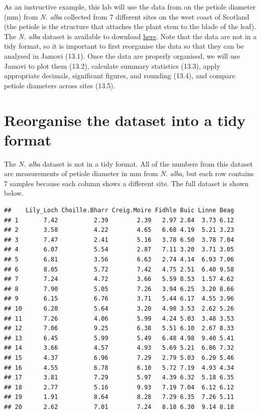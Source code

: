 \documentclass[
]{scrbook}
\begin{document}
As an instructive example, this lab will use the data from \citet{Law2014} on the petiole diameter (mm) from \emph{N. alba} collected from 7 different sites on the west coast of Scotland (the petiole is the structure that attaches the plant stem to the blade of the leaf).
The \emph{N. alba} dataset is available to download \href{https://raw.githubusercontent.com/bradduthie/statistical_techniques/main/data/Nymphaea_alba.csv}{here}.
Note that the data are not in a tidy format, so it is important to first reorganise the data so that they can be analysed in Jamovi (13.1).
Once the data are properly organised, we will use Jamovi to plot them (13.2), calculate summary statistics (13.3), apply appropriate decimals, significant figures, and rounding (13.4), and compare petiole diameters across sites (13.5).

\hypertarget{reorganise-the-dataset-into-a-tidy-format}{%
\section{Reorganise the dataset into a tidy format}\label{reorganise-the-dataset-into-a-tidy-format}}

The \emph{N. alba} dataset is not in a tidy format.
All of the numbers from this dataset are measurements of petiole diameter in mm from \emph{N. alba}, but each row contains 7 samples because each column shows a different site.
The full dataset is shown below.

\begin{verbatim}
##    Lily_Loch Choille.Bharr Creig.Moire Fidhle Buic Linne Beag
## 1       7.42          2.39        2.39   2.97 2.84  3.73 6.12
## 2       3.58          4.22        4.65   6.68 4.19  5.21 3.23
## 3       7.47          2.41        5.16   3.78 6.50  3.78 7.04
## 4       6.07          5.54        2.87   7.11 3.20  3.71 3.05
## 5       6.81          3.56        6.63   2.74 4.14  6.93 7.06
## 6       8.05          5.72        7.42   4.75 2.51  6.40 9.58
## 7       7.24          4.72        3.66   5.59 8.53  1.57 4.62
## 8       7.90          5.05        7.26   3.94 6.25  3.20 8.66
## 9       6.15          6.76        3.71   5.44 6.17  4.55 3.96
## 10      6.20          5.64        3.20   4.98 3.53  2.62 5.26
## 11      7.26          4.06        5.99   4.24 5.03  3.48 3.53
## 12      7.06          9.25        6.38   5.51 6.10  2.67 8.33
## 13      6.45          5.99        5.49   6.48 4.98  9.40 5.41
## 14      3.66          4.57        4.93   5.69 5.21  6.86 7.32
## 15      4.37          6.96        7.29   2.79 5.03  6.20 5.46
## 16      4.55          6.78        6.10   5.72 7.19  4.93 4.34
## 17      3.81          7.29        5.97   4.39 6.32  5.18 6.35
## 18      2.77          5.16        9.93   7.19 7.04  6.12 6.12
## 19      1.91          8.64        8.28   7.29 6.35  7.26 5.11
## 20      2.62          7.01        7.24   8.18 6.30  9.14 8.18
\end{verbatim}
\end{document}

